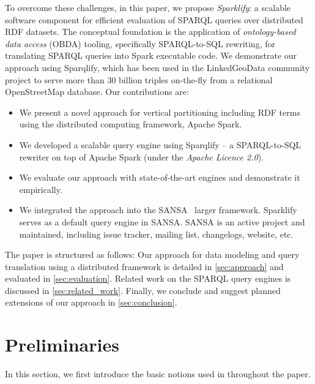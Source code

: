 To overcome these challenges, in this paper, we propose \emph{Sparklify}: a scalable software component for efficient evaluation of SPARQL queries over distributed RDF datasets. The conceptual foundation is the application of \emph{ontology-based data access} (OBDA) tooling, specifically SPARQL-to-SQL rewriting, for translating SPARQL queries into Spark executable code. We demonstrate our approach using Sparqlify, which has been used in the LinkedGeoData community project to serve more than 30 billion triples on-the-fly from a relational OpenStreetMap database.
Our contributions are:
\begin{itemize}
 \item We present a novel approach for vertical partitioning including RDF terms using the distributed computing framework, Apache Spark.
 \item We developed a scalable query engine using Sparqlify -- a SPARQL-to-SQL rewriter on top of Apache Spark (under the \textit{Apache Licence 2.0}).
 \item We evaluate our approach with state-of-the-art engines and demonstrate it empirically.
 \item We integrated the approach into the SANSA~\cite{lehmann-2017-sansa-iswc} larger framework.
 Sparklify serves as a default query engine in SANSA.
 SANSA is an active project and maintained, including issue tracker, mailing list, changelogs, website, etc.
\end{itemize}

The paper is structured as follows:
Our approach for data modeling and query translation using a distributed framework is detailed in \autoref{sec:approach} and evaluated in \autoref{sec:evaluation}.
Related work on the SPARQL query engines is discussed in \autoref{sec:related_work}.
Finally, we conclude and suggest planned extensions of our approach in \autoref{sec:conclusion}.

\section{Preliminaries}
\label{sec:preliminaries}
In this section, we first introduce the basic notions used in throughout the paper.


